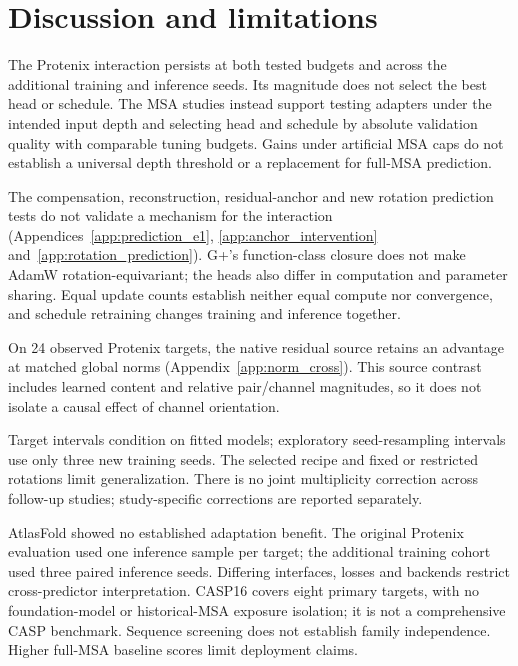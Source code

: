 \section{Discussion and limitations}
\label{sec:discussion}
The Protenix interaction persists at both tested budgets and across the
additional training and inference seeds. Its magnitude does not select
the best head or schedule. The MSA studies instead support testing adapters
under the intended input depth and selecting head and schedule by absolute
validation quality with comparable tuning budgets. Gains under artificial
MSA caps do not establish a universal depth threshold or a replacement
for full-MSA prediction.

The compensation, reconstruction, residual-anchor and new rotation
prediction tests do not validate a mechanism for the interaction
(Appendices~\ref{app:prediction_e1}, \ref{app:anchor_intervention}
and~\ref{app:rotation_prediction}). G+'s function-class closure does not
make AdamW rotation-equivariant; the heads also differ in computation and
parameter sharing. Equal update counts establish neither equal compute
nor convergence, and schedule retraining changes training and inference together.

On 24 observed Protenix targets, the native residual source retains an
advantage at matched global norms (Appendix~\ref{app:norm_cross}).
This source contrast includes learned content and relative pair/channel
magnitudes, so it does not isolate a causal effect of channel orientation.

Target intervals condition on fitted models; exploratory seed-resampling
intervals use only three new training seeds. The selected recipe and fixed
or restricted rotations limit generalization. There is no joint
multiplicity correction across follow-up studies; study-specific corrections
are reported separately.

AtlasFold showed no established adaptation benefit. The original Protenix
evaluation used one inference sample per target; the additional training
cohort used three paired inference seeds. Differing interfaces, losses and
backends restrict cross-predictor interpretation. CASP16 covers eight primary targets,
with no foundation-model or historical-MSA exposure isolation; it is not
a comprehensive CASP benchmark. Sequence screening does not establish
family independence. Higher full-MSA baseline scores limit deployment claims.
